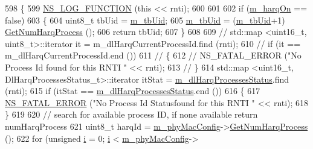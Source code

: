\begin{DoxyCode}
598 \{
599         \hyperlink{log-macros-disabled_8h_a90b90d5bad1f39cb1b64923ea94c0761}{NS\_LOG\_FUNCTION} (\textcolor{keyword}{this} << rnti);
600 
601 
602         \textcolor{keywordflow}{if} (\hyperlink{classns3_1_1MmWaveFlexTtiPfMacScheduler_ab7edfa7baaf0e2ce6c2ba43efc59e291}{m\_harqOn} == \textcolor{keyword}{false})
603         \{
604                 uint8\_t tbUid = \hyperlink{classns3_1_1MmWaveFlexTtiPfMacScheduler_ad67ede1dc070d024283a2fcd765fded9}{m\_tbUid};
605                 \hyperlink{classns3_1_1MmWaveFlexTtiPfMacScheduler_ad67ede1dc070d024283a2fcd765fded9}{m\_tbUid} = (\hyperlink{classns3_1_1MmWaveFlexTtiPfMacScheduler_ad67ede1dc070d024283a2fcd765fded9}{m\_tbUid}+1) %
      \hyperlink{classns3_1_1MmWavePhyMacCommon_a40773d84172ebeb5aff125f56ebcc5ac}{GetNumHarqProcess} ();
606                 \textcolor{keywordflow}{return} tbUid;
607         \}
608 
609 \textcolor{comment}{//      std::map <uint16\_t, uint8\_t>::iterator it = m\_dlHarqCurrentProcessId.find (rnti);}
610 \textcolor{comment}{//      if (it == m\_dlHarqCurrentProcessId.end ())}
611 \textcolor{comment}{//      \{}
612 \textcolor{comment}{//              NS\_FATAL\_ERROR ("No Process Id found for this RNTI " << rnti);}
613 \textcolor{comment}{//      \}}
614         std::map <uint16\_t, DlHarqProcessesStatus\_t>::iterator itStat = 
      \hyperlink{classns3_1_1MmWaveFlexTtiPfMacScheduler_ac8fbe1bcc35d738ae7944797590909fc}{m\_dlHarqProcessesStatus}.find (rnti);
615         \textcolor{keywordflow}{if} (itStat == \hyperlink{classns3_1_1MmWaveFlexTtiPfMacScheduler_ac8fbe1bcc35d738ae7944797590909fc}{m\_dlHarqProcessesStatus}.end ())
616         \{
617                 \hyperlink{group__fatal_ga5131d5e3f75d7d4cbfd706ac456fdc85}{NS\_FATAL\_ERROR} (\textcolor{stringliteral}{"No Process Id Statusfound for this RNTI "} << rnti);
618         \}
619 
620         \textcolor{comment}{// search for available process ID, if none available return numHarqProcess}
621         uint8\_t harqId = \hyperlink{classns3_1_1MmWaveMacScheduler_a24d7af4971d2e500fe543cefbafa2fd9}{m\_phyMacConfig}->\hyperlink{classns3_1_1MmWavePhyMacCommon_a40773d84172ebeb5aff125f56ebcc5ac}{GetNumHarqProcess} ();
622         \textcolor{keywordflow}{for} (\textcolor{keywordtype}{unsigned} \hyperlink{bernuolliDistribution_8m_a6f6ccfcf58b31cb6412107d9d5281426}{i} = 0; \hyperlink{bernuolliDistribution_8m_a6f6ccfcf58b31cb6412107d9d5281426}{i} < \hyperlink{classns3_1_1MmWaveMacScheduler_a24d7af4971d2e500fe543cefbafa2fd9}{m\_phyMacConfig}->

\end{DoxyCode}
